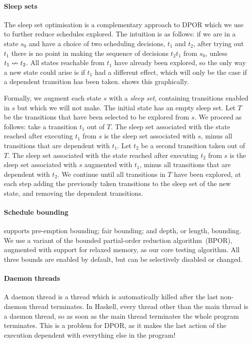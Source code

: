 \paragraph{Sleep sets}
The sleep set optimisation\cite{godefroid1996} is a complementary
approach to DPOR which we use to further reduce schedules explored.
The intuition is as follows: if we are in a state $s_{0}$ and have a
choice of two scheduling decisions, $t_{1}$ and $t_{2}$, after trying
out $t_{1}$ there is no point in making the sequence of decisions
$t_{2}t_{1}$ from $s_{0}$, unless $t_{1} \nleftrightarrow t_{2}$.  All
states reachable from $t_{1}$ have already been explored, so the only
way a new state could arise is if $t_{1}$ had a different effect,
which will only be the case if a dependent transition has been taken.
 shows this graphically.

Formally, we augment each state $s$ with a \emph{sleep set},
containing transitions enabled in $s$ but which we will not make.  The
initial state has an empty sleep set.  Let $T$ be the transitions that
have been selected to be explored from $s$.  We proceed as follows:
take a transition $t_{1}$ out of $T$.  The sleep set associated with
the state reached after executing $t_{1}$ from $s$ is the sleep set
associated with $s$, minus all transitions that are dependent with
$t_{1}$.  Let $t_{2}$ be a second transition taken out of $T$.  The
sleep set associated with the state reached after executing $t_{2}$
from $s$ is the sleep set associated with $s$ augmented with $t_{1}$,
minus all transitions that are dependent with $t_{2}$.  We continue
until all transitions in $T$ have been explored, at each step adding
the previously taken transitions to the sleep set of the new state,
and removing the dependent transitions.

\paragraph{Schedule bounding}
\dejafu{} supports pre-emption bounding\cite{musuvathi2007}; fair
bounding\cite{musuvathi2008}; and depth, or length,
bounding\cite{russell2002}.  We use a variant of the bounded
partial-order reduction algorithm~(BPOR)\cite{coons2013}, augmented
with support for relaxed memory\cite{zhang2015}, as our core testing
algorithm.  All three bounds are enabled by default, but can be
selectively disabled or changed.

\paragraph{Daemon threads}
A daemon thread is a thread which is automatically killed after the
last non-daemon thread terminates.  In Haskell, every thread other
than the main thread is a daemon thread, so as soon as the main thread
terminates the whole program terminates.  This is a problem for DPOR,
as it makes the last action of the execution dependent with everything
else in the program!

